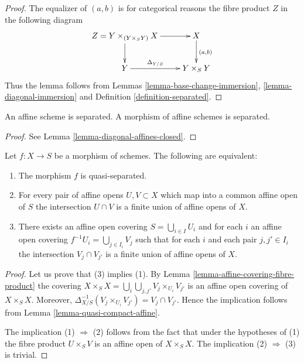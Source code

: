 \begin{proof}
The equalizer of $(a, b)$ is for categorical reasons
the fibre product $Z$ in the following diagram
$$
\xymatrix{
Z = Y \times_{(Y \times_S Y)} X \ar[r] \ar[d] &
 X \ar[d]^{(a ,b)} \\
Y \ar[r]^-{\Delta_{Y/S}} & Y \times_S Y
}
$$
Thus the lemma follows from Lemmas
\ref{lemma-base-change-immersion}, \ref{lemma-diagonal-immersion} and
Definition \ref{definition-separated}.
\end{proof}

\begin{lemma}
\label{lemma-affine-separated}
An affine scheme is separated.
A morphism of affine schemes is separated.
\end{lemma}

\begin{proof}
See Lemma \ref{lemma-diagonal-affines-closed}.
\end{proof}

\begin{lemma}
\label{lemma-characterize-quasi-separated}
Let $f : X \to S$ be a morphism of schemes.
The following are equivalent:
\begin{enumerate}
\item The morphism $f$ is quasi-separated.
\item For every pair of affine opens $U, V \subset X$
which map into a common affine open of $S$ the intersection
$U \cap V$ is a finite union of affine opens of $X$.
\item There exists an affine open covering $S = \bigcup_{i \in I} U_i$
and for each $i$ an affine open covering $f^{-1}U_i = \bigcup_{j \in I_i} V_j$
such that for each $i$ and each pair $j, j' \in I_i$ the
intersection $V_j \cap V_{j'}$ is a finite union of affine
opens of $X$.
\end{enumerate}
\end{lemma}

\begin{proof}
Let us prove that (3) implies (1).
By Lemma \ref{lemma-affine-covering-fibre-product}
the covering $X \times_S X = \bigcup_i \bigcup_{j, j'} V_j \times_{U_i} V_{j'}$
is an affine open covering of $X\times_S X$.
Moreover, $\Delta_{X/S}^{-1}(V_j \times_{U_i} V_{j'}) = V_j \cap V_{j'}$.
Hence the implication follows from Lemma \ref{lemma-quasi-compact-affine}.

\medskip\noindent
The implication (1) $\Rightarrow$ (2) follows from the fact
that under the hypotheses of (1) the fibre product
$U \times_S V$ is an affine open of $X \times_S X$.
The implication (2) $\Rightarrow$ (3) is trivial.
\end{proof}

